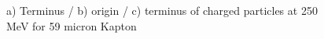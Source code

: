 \documentclass{article}
\begin{document}
\begin{figure}[H]
\centering
{}
\caption{a) Terminus / b) origin / c) terminus of charged particles at 250 MeV for 59 micron Kapton}
\label{fig:G4_stats}
\end{figure}
\end{document}
